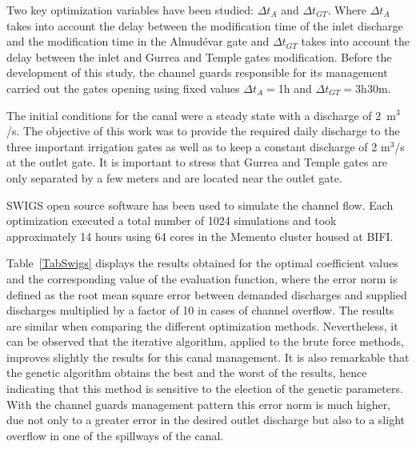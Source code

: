 \documentclass[review,authoryear]{elsarticle}
\begin{document}
Two key optimization variables have been studied: $\Delta t_A$ and
$\Delta t_{GT}$. Where $\Delta t_A$ takes into account the delay between the
modification time of the inlet discharge and the modification time in the
Almudévar gate and $\Delta t_{GT}$ takes into account the delay between the
inlet and Gurrea and Temple gates modification. Before the development of this 
study, the channel guards responsible for its management carried out the gates
opening using fixed values $\Delta t_A=$1h and $\Delta t_{GT}=$3h30m.

The initial conditions for the canal were a steady state with a discharge of
2~m$^3$/s. The objective of this work was to provide
the required daily discharge to the three important irrigation gates as well as
to keep a constant discharge of 2 m$^3$/s at the outlet gate. It is important to 
stress that Gurrea and Temple gates are only separated by a few meters and are located
near the outlet gate.

SWIGS open source software \citep{Swigs} has been used to simulate the channel
flow. Each optimization executed a total number of 1024 simulations and took 
approximately 14 hours using 64 cores in the Memento cluster housed at BIFI.

Table~\ref{TabSwigs} displays the results obtained for the optimal coefficient
values and the corresponding value of the evaluation function, where the error
norm is defined as the root mean square error between demanded discharges and
supplied discharges multiplied by a factor of 10 in cases of channel overflow.
The results are similar when comparing the different optimization methods.
Nevertheless, it can be observed that the iterative algorithm, applied to the 
brute force methods, improves slightly the results for this canal management.
It is also remarkable that the genetic algorithm obtains the best
and the worst of the results, hence indicating that this method
is sensitive to the election of the genetic parameters. With the channel
guards management pattern this error norm is much higher, due not only to a greater error
in the desired outlet discharge but also to a slight overflow in one of the 
spillways of the canal.
\end{document}
